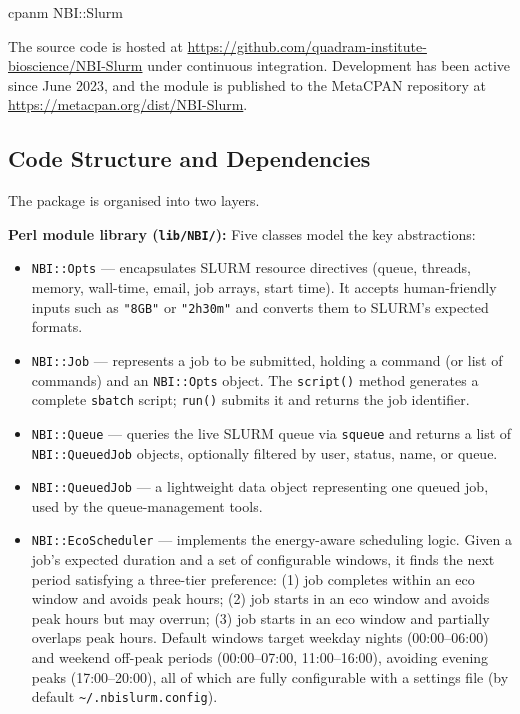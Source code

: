 \documentclass[
]{article}
\newenvironment{Shaded}{}{}
\newcommand{\ExtensionTok}[1]{#1}
\newcommand{\NormalTok}[1]{#1}
\providecommand{\tightlist}{%
  \setlength{\itemsep}{0pt}\setlength{\parskip}{0pt}}
\begin{document}
\begin{Shaded}
\begin{Highlighting}[]
\ExtensionTok{cpanm}\NormalTok{ NBI::Slurm}
\end{Highlighting}
\end{Shaded}

The source code is hosted at
\url{https://github.com/quadram-institute-bioscience/NBI-Slurm} under
continuous integration. Development has been active since June 2023, and
the module is published to the MetaCPAN repository at
\url{https://metacpan.org/dist/NBI-Slurm}.

\subsection{Code Structure and
Dependencies}\label{code-structure-and-dependencies}

The package is organised into two layers.

\textbf{Perl module library (\texttt{lib/NBI/}):} Five classes model the
key abstractions:

\begin{itemize}
\tightlist
\item
  \texttt{NBI::Opts} --- encapsulates SLURM resource directives (queue,
  threads, memory, wall-time, email, job arrays, start time). It accepts
  human-friendly inputs such as \texttt{"8GB"} or \texttt{"2h30m"} and
  converts them to SLURM's expected formats.
\item
  \texttt{NBI::Job} --- represents a job to be submitted, holding a
  command (or list of commands) and an \texttt{NBI::Opts} object. The
  \texttt{script()} method generates a complete \texttt{sbatch} script;
  \texttt{run()} submits it and returns the job identifier.
\item
  \texttt{NBI::Queue} --- queries the live SLURM queue via
  \texttt{squeue} and returns a list of \texttt{NBI::QueuedJob} objects,
  optionally filtered by user, status, name, or queue.
\item
  \texttt{NBI::QueuedJob} --- a lightweight data object representing one
  queued job, used by the queue-management tools.
\item
  \texttt{NBI::EcoScheduler} --- implements the energy-aware scheduling
  logic. Given a job's expected duration and a set of configurable
  windows, it finds the next period satisfying a three-tier preference:
  (1) job completes within an eco window and avoids peak hours; (2) job
  starts in an eco window and avoids peak hours but may overrun; (3) job
  starts in an eco window and partially overlaps peak hours. Default
  windows target weekday nights (00:00--06:00) and weekend off-peak
  periods (00:00--07:00, 11:00--16:00), avoiding evening peaks
  (17:00--20:00), all of which are fully configurable with a settings
  file (by default \texttt{\textasciitilde{}/.nbislurm.config}).
\end{itemize}
\end{document}
